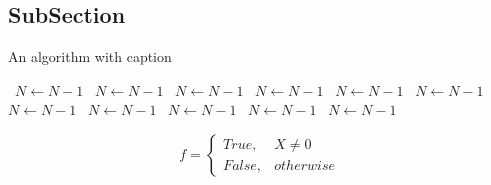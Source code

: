 \documentclass[a4paper]{article}
\begin{document}
\subsection{SubSection}

\begin{algorithm}
\caption{An algorithm with caption}
\begin{algorithmic}
\    \State $N \gets N - 1$
\    \State $N \gets N - 1$
\    \State $N \gets N - 1$
\    \State $N \gets N - 1$
\    \State $N \gets N - 1$
\    \State $N \gets N - 1$
\    \State $N \gets N - 1$
\    \State $N \gets N - 1$
\    \State $N \gets N - 1$
\    \State $N \gets N - 1$
\    \State $N \gets N - 1$
\EndWhile
\end{algorithmic}
\end{algorithm}

\begin{equation}   f =
\begin{cases} True, & X \neq 0\\
False, & otherwise
\end{cases}
\end{equation}
\end{document}
